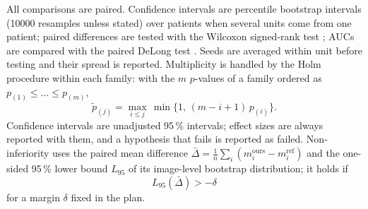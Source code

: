 All comparisons are paired. Confidence intervals are percentile bootstrap intervals \cite{efron1993bootstrap} (\num{10000} resamples unless
stated) over patients when several units come from one patient; paired differences are tested with the Wilcoxon signed-rank test
\cite{wilcoxon1945individual}; AUCs are compared with the paired DeLong test \cite{delong1988auc}. Seeds are averaged within unit before
testing and their spread is reported. Multiplicity is handled by the Holm procedure \cite{holm1979simple} within each family: with the $m$
$p$-values of a family ordered as $p_{(1)}\le\dots\le p_{(m)}$,
\begin{equation}
\tilde p_{(j)}=\max_{i\le j}\,\min\big\{1,\,(m-i+1)\,p_{(i)}\big\}.
\label{eq:holm}
\end{equation}
Confidence intervals are unadjusted 95\,\% intervals; effect sizes are always reported with them, and a hypothesis that fails is reported as
failed. Non-inferiority uses the paired mean difference $\bar\Delta=\frac1n\sum_i(m_i^{\mathrm{ours}}-m_i^{\mathrm{ref}})$ and the
one-sided 95\,\% lower bound $L_{95}$ of its image-level bootstrap distribution; it holds if
\begin{equation}
L_{95}(\bar\Delta)>-\delta
\label{eq:ni}
\end{equation}
for a margin $\delta$ fixed in the plan.

